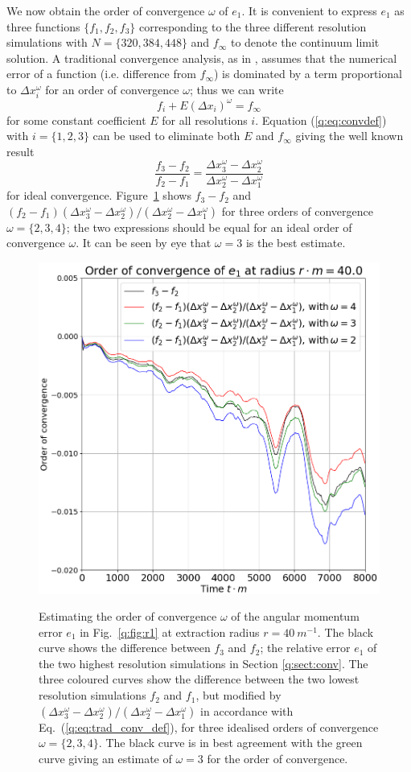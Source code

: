 We now obtain the order of convergence $\omega$ of $e_1$. It is convenient to express $e_1$ as three functions $\{f_1,f_2,f_3\}$ corresponding to the three different resolution simulations with $N=\{320,384,448\}$ and $f_\infty$ to denote the continuum limit solution. A traditional convergence analysis, as in \cite{PresTeukVettFlan92}, assumes that the numerical error of a function (i.e. difference from $f_\infty$) is dominated by a term proportional to $\Delta x_i^\omega$ for an order of convergence $\omega$; thus we can write
\begin{equation}\label{q:eq:convdef}f_i + E (\Delta x_i)^\omega = f_\infty\end{equation}
for some constant coefficient $E$ for all resolutions $i$. Equation (\ref{q:eq:convdef}) with $i=\{1,2,3\}$ can be used to eliminate both $E$ and $f_\infty$ giving the well known result
\begin{equation}
\label{q:eq:trad_conv_def}\frac{f_3-f_2}{f_2-f_1} = \frac{ \Delta x_3^\omega-\Delta x_2^\omega }{ \Delta x_2^\omega-\Delta x_1^\omega }
\end{equation}
for ideal convergence. Figure~\ref{q:fig:234} shows $f_3-f_2$ and $(f_2-f_1 )(\Delta x_3^\omega - \Delta x_2^\omega)/(\Delta x_2^\omega - \Delta x_1^\omega)$ for three orders of convergence $\omega=\{2,3,4\}$; the two expressions should be equal for an ideal order of convergence $\omega$. It can be seen by eye that $\omega=3$ is the best estimate.
\begin{figure}[h]
{\includegraphics[width=0.65\columnwidth]{png/paper_conv123.png}}
\caption{Estimating the order of convergence $\omega$ of the angular momentum error $e_1$ in Fig.~\ref{q:fig:r1} at extraction radius $r=40 ~m^{-1}$. The black curve shows the difference between $f_3$ and $f_2$; the relative error $e_1$ of the two highest resolution simulations in Section \ref{q:sect:conv}. The three coloured curves show the difference between the two lowest resolution simulations $f_2$ and $f_1$, but modified by $(\Delta x_3^\omega - \Delta x_2^\omega)/(\Delta x_2^\omega - \Delta x_1^\omega)$ in accordance with Eq.~(\ref{q:eq:trad_conv_def}), for three idealised orders of convergence $\omega=\{2,3,4\}$. The black curve is in best agreement with the green curve giving an estimate of $\omega=3$ for the order of convergence. }
\label{q:fig:234}
\end{figure}



